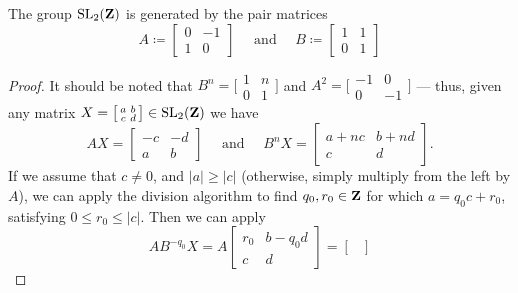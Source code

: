 \begin{proposition}
    \label{prop:SL_2(Z)-generator-matrices}
    The group \(\operatorname{SL}_2(\mathbf{Z})\) is generated by the pair matrices
    \[
        A \coloneq
        \begin{bmatrix}
            0 & -1 \\
            1 & 0
        \end{bmatrix}
        \quad
        \text{ and }
        \quad
        B \coloneq
        \begin{bmatrix}
            1 & 1 \\
            0 & 1
        \end{bmatrix}
    \]
\end{proposition}

\begin{proof}
    It should be noted that \(B^n = \big[ \begin{smallmatrix} 1 & n \\ 0 &
            1 \end{smallmatrix} \big]\) and \(A^2 = \big[ \begin{smallmatrix} -1 & 0 \\ 0 &
            -1 \end{smallmatrix} \big]\) --- thus, given any matrix \(X =
    \big[ \begin{smallmatrix} a & b \\ c & d \end{smallmatrix} \big] \in \operatorname{SL}_2(\mathbf{Z})\)
    we have
    \[
        A X =
        \begin{bmatrix}
            -c & -d \\ a & b
        \end{bmatrix}
        \quad
        \text{ and }
        \quad
        B^n X =
        \begin{bmatrix}
            a + n c & b + n d \\ c & d
        \end{bmatrix}.
    \]
    If we assume that \(c \neq 0\), and \(|a| \geq |c|\) (otherwise, simply multiply
    from the left by \(A\)), we can apply the division algorithm to find \(q_0, r_0
    \in \mathbf{Z}\) for which \(a = q_0 c + r_0\), satisfying \(0 \leq r_0 \leq
    |c|\). Then we can apply
    \[
        A B^{-q_0}X = A
        \begin{bmatrix}
            r_0 & b - q_0 d \\ c & d
        \end{bmatrix}
        =
        \begin{bmatrix}

\end{bmatrix}\]
\end{proof}
